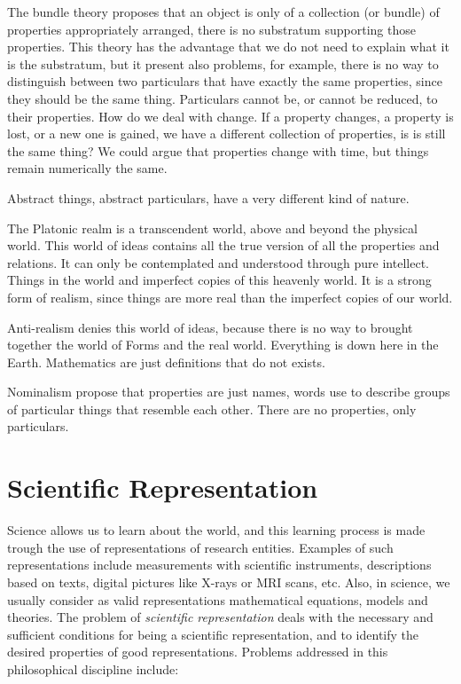 The bundle theory proposes that an object is only of a collection (or bundle) of properties appropriately arranged, there is no substratum supporting those properties. This theory has the advantage that we do not need to explain what it is the substratum, but it present also problems, for example, there is no way to distinguish between two particulars that have exactly the same properties, since they should be the same thing. Particulars cannot be, or cannot be reduced, to their properties. How do we deal with change. If a property changes, a property is lost, or a new one is gained, we have a different collection of properties, is is still the same thing? We could argue that properties change with time, but things remain numerically the same.

Abstract things, abstract particulars, have a very different kind of nature.

The Platonic realm is a transcendent world, above and beyond the physical world. This world of ideas contains all the true version of all the properties and relations. It can only be contemplated and understood through pure intellect. Things in the world and imperfect copies of this heavenly world. It is a strong form of realism, since things are more real than the imperfect copies of our world.

Anti-realism denies this world of ideas, because there is no way to brought together the world of Forms and the real world. Everything is down here in the Earth. Mathematics are just definitions that do not exists.

Nominalism propose that properties are just names, words use to describe groups of particular things that resemble each other. There are no properties, only particulars.

\section{Scientific Representation}
\label{sec:scientific_representation}

Science allows us to learn about the world, and this learning process is made trough the use of representations of research entities. Examples of such representations include measurements with scientific instruments, descriptions based on texts, digital pictures like X-rays or MRI scans, etc. Also, in science, we usually consider as valid representations mathematical equations, models and theories. The problem of \emph{scientific representation} deals with the necessary and sufficient conditions for being a scientific representation, and to identify the desired properties of good representations. Problems addressed in this philosophical discipline include:

